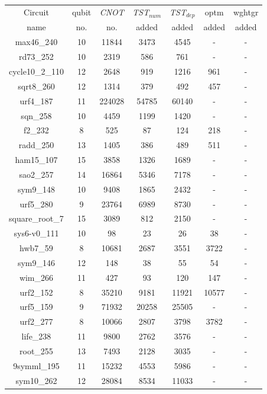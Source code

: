 \documentclass[runningheads]{llncs}
\begin{document}
		\begin{table}[H]
			\label{tab4}
			\begin{center}  
			\begin{tabular}{|c|c|c|c|c|c|c|}
			\hline
			Circuit &  qubit  & \textit{CNOT} &\textit{TST$_{num}$}& \textit{TST$_{dep}$}  & optm 	 & wghtgr 	\\
			 name	&   no. 	&	no. & added&  added &  added 	&  added\\
			\hline
			max46\_240 & 10 & 11844 & 3473 & 4545 & - & - \\ 
rd73\_252 & 10 & 2319 & 586 & 761 & - & - \\ 
cycle10\_2\_110 & 12 & 2648 & 919 & 1216 & 961 & - \\ 
sqrt8\_260 & 12 & 1314 & 379 & 492 & 457 & - \\ 
urf4\_187 & 11 & 224028 & 54785 & 60140 & - & - \\ 
sqn\_258 & 10 & 4459 & 1199 & 1420 & - & - \\ 
f2\_232 & 8 & 525 & 87 & 124 & 218 & - \\ 
radd\_250 & 13 & 1405 & 386 & 489 & 511 & - \\ 
ham15\_107 & 15 & 3858 & 1326 & 1689 & - & - \\ 
sao2\_257 & 14 & 16864 & 5346 & 7178 & - & - \\ 
sym9\_148 & 10 & 9408 & 1865 & 2432 & - & - \\ 
urf5\_280 & 9 & 23764 & 6989 & 8730 & - & - \\ 
square\_root\_7 & 15 & 3089 & 812 & 2150 & - & - \\ 
sys6-v0\_111 & 10 & 98 & 23 & 26 & 38 & - \\ 
hwb7\_59 & 8 & 10681 & 2687 & 3551 & 3722 & - \\ 
sym9\_146 & 12 & 148 & 38 & 55 & 54 & - \\ 
wim\_266 & 11 & 427 & 93 & 120 & 147 & - \\ 
urf2\_152 & 8 & 35210 & 9181 & 11921 & 10577 & - \\ 
urf5\_159 & 9 & 71932 & 20258 & 25505 & - & - \\ 
urf2\_277 & 8 & 10066 & 2807 & 3798 & 3782 & - \\ 
life\_238 & 11 & 9800 & 2762 & 3576 & - & - \\ 
root\_255 & 13 & 7493 & 2128 & 3035 & - & - \\ 
9symml\_195 & 11 & 15232 & 4553 & 5986 & - & - \\ 
sym10\_262 & 12 & 28084 & 8534 & 11033 & - & - \\ 

\end{tabular}
\end{center}
\end{table}
\end{document}
